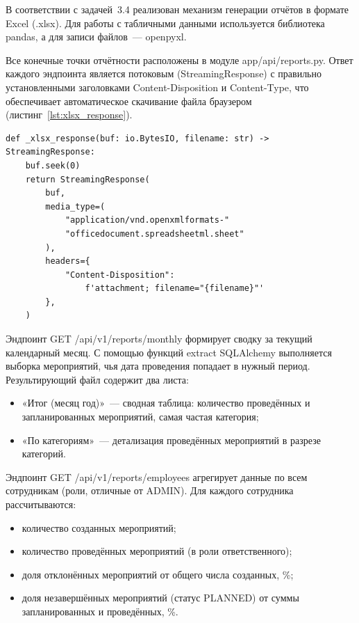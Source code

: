 В соответствии с задачей~3.4 реализован механизм генерации отчётов
в формате Excel (.xlsx). Для работы с табличными
данными используется библиотека pandas, а для записи
файлов~--- openpyxl.

Все конечные точки отчётности расположены в модуле
app/api/reports.py. Ответ каждого эндпоинта является
потоковым (StreamingResponse) с правильно установленными
заголовками Content-Disposition и Content-Type,
что обеспечивает автоматическое скачивание файла браузером
(листинг~\ref{lst:xlsx_response}).

\begin{lstlisting}[caption={Вспомогательная функция формирования Excel-ответа}, label={lst:xlsx_response}]
def _xlsx_response(buf: io.BytesIO, filename: str) -> StreamingResponse:
    buf.seek(0)
    return StreamingResponse(
        buf,
        media_type=(
            "application/vnd.openxmlformats-"
            "officedocument.spreadsheetml.sheet"
        ),
        headers={
            "Content-Disposition":
                f'attachment; filename="{filename}"'
        },
    )
\end{lstlisting}


Эндпоинт GET /api/v1/reports/monthly формирует сводку за
текущий календарный месяц. С помощью функций extract
SQLAlchemy выполняется выборка мероприятий, чья дата проведения
попадает в нужный период. Результирующий файл содержит два листа:
\begin{itemize}
    \item «Итог (месяц год)»~--- сводная таблица: количество
          проведённых и запланированных мероприятий, самая частая
          категория;
    \item «По категориям»~--- детализация проведённых мероприятий
          в разрезе категорий.
\end{itemize}

Эндпоинт GET /api/v1/reports/employees агрегирует данные
по всем сотрудникам (роли, отличные от ADMIN). Для каждого
сотрудника рассчитываются:
\begin{itemize}
    \item количество созданных мероприятий;
    \item количество проведённых мероприятий (в роли ответственного);
    \item доля отклонённых мероприятий от общего числа созданных, \%;
    \item доля незавершённых мероприятий (статус PLANNED) от
          суммы запланированных и проведённых, \%.
\end{itemize}

